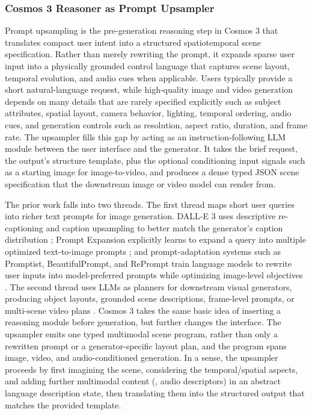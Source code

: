 \subsubsection{Cosmos 3 Reasoner as Prompt Upsampler}
\label{sec::prompt_upsampling}

Prompt upsampling is the pre-generation reasoning step in Cosmos 3 that translates compact user intent into a structured spatiotemporal scene specification. Rather than merely rewriting the prompt, it expands sparse user input into a physically grounded control language that captures scene layout, temporal evolution, and audio cues when applicable. Users typically provide a short natural-language request, while high-quality image and video generation depends on many details that are rarely specified explicitly such as subject attributes, spatial layout, camera behavior, lighting, temporal ordering, audio cues, and generation controls such as resolution, aspect ratio, duration, and frame rate. The upsampler fills this gap by acting as an instruction-following LLM module between the user interface and the generator. It takes the brief request, the output's structure template, plus the optional conditioning input signals such as a starting image for image-to-video, and produces a dense typed JSON scene specification that the downstream image or video model can render from.

The prior work falls into two threads. The first thread maps short user queries into richer text prompts for image generation. DALL-E 3 uses descriptive re-captioning and caption upsampling to better match the generator's caption distribution \citep{betker2023improving}; Prompt Expansion explicitly learns to expand a query into multiple optimized text-to-image prompts \citep{datta-etal-2024-prompt}; and prompt-adaptation systems such as Promptist, BeautifulPrompt, and RePrompt train language models to rewrite user inputs into model-preferred prompts while optimizing image-level objectives \citep{hao2023optimizing,cao-etal-2023-beautifulprompt,wu2025reprompt}. The second thread uses LLMs as planners for downstream visual generators, producing object layouts, grounded scene descriptions, frame-level prompts, or multi-scene video plans \citep{lian2024llmgrounded,feng2023layoutgpt,hong2023direct2v,
lin2023videodirectorgpt}. Cosmos 3 takes the same basic idea of inserting a reasoning module before generation, but further changes the interface. The upsampler emits one typed multimodal scene program, rather than only a rewritten prompt or a generator-specific layout plan, and the program spans image, video, and audio-conditioned generation. In a sense, the upsampler proceeds by first imagining the scene, considering the temporal/spatial aspects, and adding further multimodal content (\eg, audio descriptors) in an abstract language description state, then translating them into the structured output that matches the provided template.

